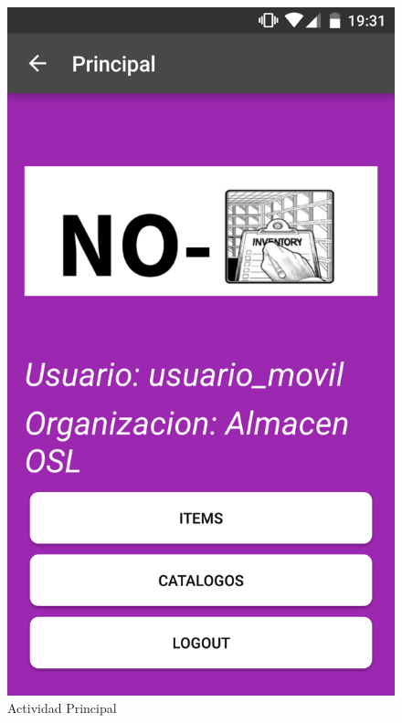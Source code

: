\documentclass[a4paper,11pt]{book}
\begin{document}
\begin{figure}[H]
  \includegraphics[width=\linewidth]{imagenes/pruebas/movil/movil.png}
  \caption{Actividad Principal\cite{propio}}
\endminipage\hfill
{}

\end{figure}
\end{document}
